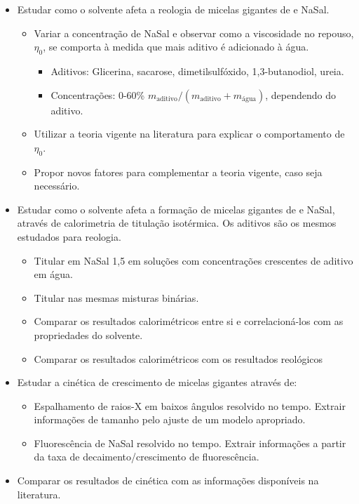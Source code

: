 		\begin{itemize}[noitemsep]
			\item Estudar como o solvente afeta a reologia de micelas gigantes de \CTAB{} e NaSal.
				\begin{itemize}[noitemsep]
					\item Variar a concentração de NaSal e observar como a viscosidade no repouso, \(\eta_0\), se comporta à medida que mais aditivo é adicionado à água.
						\begin{itemize}[noitemsep]
							\item Aditivos: Glicerina, sacarose, dimetilsulfóxido, 1,3-butanodiol, ureia.
							\item Concentrações: 0-60\% \(m_{\textrm{aditivo}}/\left(m_{\textrm{aditivo}}+m_{\textrm{água}}\right)\), dependendo do aditivo.
						\end{itemize}
					\item Utilizar a teoria vigente na literatura para explicar o comportamento de \(\eta_0\).
					\item Propor novos fatores para complementar a teoria vigente, caso seja necessário.
				\end{itemize}
			\item Estudar como o solvente afeta a formação de micelas gigantes de \TTAB{} e NaSal, através de calorimetria de titulação isotérmica. Os aditivos são os mesmos estudados para reologia.
				\begin{itemize}[noitemsep]
					\item Titular \TTAB{} em NaSal 1,5\mM{} em soluções com concentrações crescentes de aditivo em água.
					\item Titular \TTAB{} nas mesmas misturas binárias.
					\item Comparar os resultados calorimétricos entre si e correlacioná-los com as propriedades do solvente.
					\item Comparar os resultados calorimétricos com os resultados reológicos
				\end{itemize}
			\item Estudar a cinética de crescimento de micelas gigantes através de:
				\begin{itemize}[noitemsep]
					\item Espalhamento de raios-X em baixos ângulos resolvido no tempo. Extrair informações de tamanho pelo ajuste de um modelo apropriado.
					\item Fluorescência de NaSal resolvido no tempo. Extrair informações a partir da taxa de decaimento/crescimento de fluorescência.
				\end{itemize}
			\item Comparar os resultados de cinética com as informações disponíveis na literatura.
		\end{itemize}
	